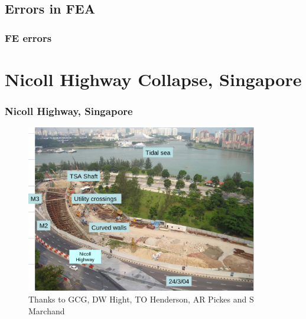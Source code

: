 \documentclass[handout]{beamer}
\begin{document}
\subsection{Errors in FEA}
\begin{frame}
\frametitle{FE errors}
\end{frame}

\section{Nicoll Highway Collapse, Singapore}
\begin{frame}
\frametitle{Nicoll Highway, Singapore}
\begin{figure}[ht]
	\centering
	\includegraphics[width=0.9\textwidth]{figs/nicoll-highway.png}
	\caption{Thanks to GCG, DW Hight, TO Henderson, AR Pickes and S Marchand }
\end{figure}
\end{frame}
\end{document}
